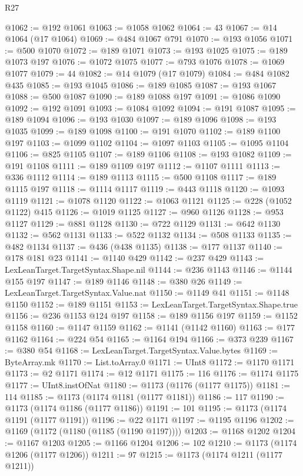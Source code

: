 \begin{lexlean}{R27}
\begin{coremodule}
@1062 := @192 @1061
@1063 := @1058 @1062
@1064 := 43
@1067 := @14 @1064 (@17 @1064)
@1069 := @484 @1067 @791
@1070 := @193 @1056
@1071 := @500 @1070
@1072 := @189 @1071
@1073 := @193 @1025
@1075 := @189 @1073 @197
@1076 := @1072 @1075
@1077 := @793 @1076
@1078 := @1069 @1077
@1079 := 44
@1082 := @14 @1079 (@17 @1079)
@1084 := @484 @1082 @435
@1085 := @193 @1045
@1086 := @189 @1085
@1087 := @193 @1067
@1088 := @500 @1087
@1090 := @189 @1088 @197
@1091 := @1086 @1090
@1092 := @192 @1091
@1093 := @1084 @1092
@1094 := @191 @1087
@1095 := @189 @1094
@1096 := @193 @1030
@1097 := @189 @1096
@1098 := @193 @1035
@1099 := @189 @1098
@1100 := @191 @1070
@1102 := @189 @1100 @197
@1103 := @1099 @1102
@1104 := @1097 @1103
@1105 := @1095 @1104
@1106 := @825 @1105
@1107 := @189 @1106
@1108 := @193 @1082
@1109 := @191 @1108
@1111 := @189 @1109 @197
@1112 := @1107 @1111
@1113 := @336 @1112
@1114 := @189 @1113
@1115 := @500 @1108
@1117 := @189 @1115 @197
@1118 := @1114 @1117
@1119 := @443 @1118
@1120 := @1093 @1119
@1121 := @1078 @1120
@1122 := @1063 @1121
@1125 := @228 (@1052 @1122) @415
@1126 := @1019 @1125
@1127 := @960 @1126
@1128 := @953 @1127
@1129 := @881 @1128
@1130 := @722 @1129
@1131 := @642 @1130
@1132 := @562 @1131
@1133 := @522 @1132
@1134 := @508 @1133
@1135 := @482 @1134
@1137 := @436 (@438 @1135)
@1138 := @177 @1137
@1140 := @178 @181 @23
@1141 := @1140 @429
@1142 := @237 @429
@1143 := LexLeanTarget.TargetSyntax.Shape.nil
@1144 := @236 @1143
@1146 := @1144 @155 @197
@1147 := @189 @1146
@1148 := @380 @26
@1149 := LexLeanTarget.TargetSyntax.Value.nat
@1150 := @1149 @41
@1151 := @1148 @1150
@1152 := @189 @1151
@1153 := LexLeanTarget.TargetSyntax.Shape.true
@1156 := @236 @1153 @124 @197
@1158 := @189 @1156 @197
@1159 := @1152 @1158
@1160 := @1147 @1159
@1162 := @1141 (@1142 @1160)
@1163 := @177 @1162
@1164 := @224 @54
@1165 := @1164 @194
@1166 := @373 @239
@1167 := @380 @54
@1168 := LexLeanTarget.TargetSyntax.Value.bytes
@1169 := ByteArray.mk
@1170 := List.toArray.{0}
@1171 := UInt8
@1172 := @1170 @1171
@1173 := @2 @1171
@1174 := @12 @1171
@1175 := 116
@1176 := @1174 @1175
@1177 := UInt8.instOfNat
@1180 := @1173 (@1176 (@1177 @1175))
@1181 := 114
@1185 := @1173 (@1174 @1181 (@1177 @1181))
@1186 := 117
@1190 := @1173 (@1174 @1186 (@1177 @1186))
@1191 := 101
@1195 := @1173 (@1174 @1191 (@1177 @1191))
@1196 := @22 @1171
@1197 := @1195 @1196
@1202 := @1169 (@1172 (@1180 (@1185 (@1190 @1197))))
@1203 := @1168 @1202
@1204 := @1167 @1203
@1205 := @1166 @1204
@1206 := 102
@1210 := @1173 (@1174 @1206 (@1177 @1206))
@1211 := 97
@1215 := @1173 (@1174 @1211 (@1177 @1211))

\end{coremodule}
\end{lexlean}
